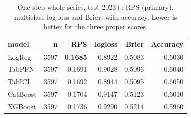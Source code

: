 \begin{table}[t]
  \centering
  \caption{One-step whole series, test 2023+: RPS (primary), multiclass log-loss and Brier, with accuracy. Lower is better for the three proper scores.}
  \label{tab:rev_c1_onestep_series}
  \begin{tabular}{lrrrrr}
  \toprule
  model & n & RPS & logloss & Brier & Accuracy \\
  \midrule
  LogReg & 3597 & \textbf{0.1685} & 0.8922 & 0.5083 & 0.6030 \\
  TabPFN & 3597 & 0.1691 & 0.9028 & 0.5096 & 0.6040 \\
  TabICL & 3597 & 0.1692 & 0.8944 & 0.5095 & 0.6050 \\
  CatBoost & 3597 & 0.1704 & 0.9147 & 0.5123 & 0.6010 \\
  XGBoost & 3597 & 0.1736 & 0.9290 & 0.5214 & 0.5960 \\
  \bottomrule
  \end{tabular}
\end{table}
